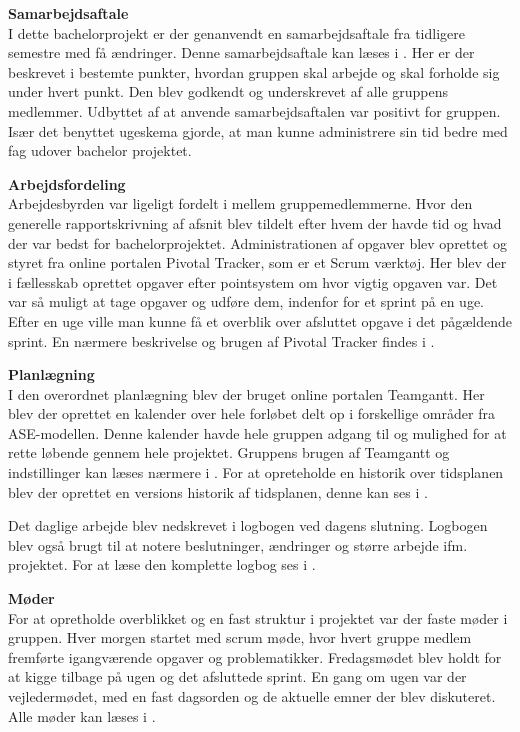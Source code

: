 \textbf{Samarbejdsaftale}\\
I dette bachelorprojekt er der genanvendt en samarbejdsaftale fra tidligere semestre med få ændringer. Denne samarbejdsaftale kan læses i . Her er der beskrevet i bestemte punkter, hvordan gruppen skal arbejde og skal forholde sig under hvert punkt. Den blev godkendt og underskrevet af alle gruppens medlemmer. Udbyttet af at anvende samarbejdsaftalen var positivt for gruppen. Især det benyttet ugeskema gjorde, at man kunne administrere sin tid bedre med fag udover bachelor projektet. 

\textbf{Arbejdsfordeling}\\
Arbejdesbyrden var ligeligt fordelt i mellem gruppemedlemmerne. Hvor den generelle rapportskrivning af afsnit blev tildelt efter hvem der havde tid og hvad der var bedst for bachelorprojektet. Administrationen  af opgaver blev oprettet og styret fra online portalen Pivotal Tracker, som er et Scrum værktøj. Her blev der i fællesskab oprettet opgaver efter pointsystem om hvor vigtig opgaven var. Det var så muligt at tage opgaver og udføre dem, indenfor for et sprint på en uge. Efter en uge ville man kunne få et overblik over afsluttet opgave i det pågældende sprint. En nærmere beskrivelse og brugen af Pivotal Tracker findes i .

\textbf{Planlægning}\\
I den overordnet planlægning blev der bruget online portalen Teamgantt. Her blev der oprettet en kalender over hele forløbet delt op i forskellige områder fra ASE-modellen. Denne kalender havde hele gruppen adgang til og mulighed for at rette løbende gennem hele projektet. Gruppens brugen af Teamgantt og indstillinger kan læses nærmere i . For at opreteholde en historik over tidsplanen blev der oprettet en versions historik af tidsplanen, denne kan ses i .

Det daglige arbejde blev nedskrevet i logbogen ved dagens slutning. Logbogen blev også brugt til at notere beslutninger, ændringer og større arbejde ifm. projektet. For at læse den komplette logbog ses i .

\textbf{Møder}\\
For at opretholde overblikket og en fast struktur i projektet var der faste møder i gruppen. Hver morgen startet med scrum møde, hvor hvert gruppe medlem fremførte igangværende opgaver og problematikker. Fredagsmødet blev holdt for at kigge tilbage på ugen og det afsluttede sprint. En gang om ugen var der vejledermødet, med en fast dagsorden og de aktuelle emner der blev diskuteret. Alle møder kan læses i .

